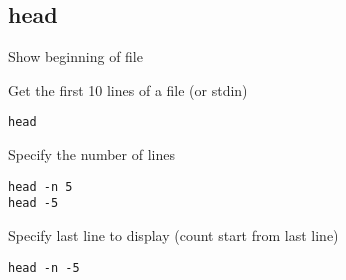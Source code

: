 \subsection{head}

\begin{frame}[fragile]{Show beginning of file}
  \begin{exampleblock}{Get the first 10 lines of a file (or stdin)}
    \begin{lstlisting}[showstringspaces=false,basicstyle=\tiny]
head
    \end{lstlisting}
  \end{exampleblock}
\pause

  \begin{exampleblock}{Specify the number of lines}
    \begin{lstlisting}[showstringspaces=false,basicstyle=\tiny]
head -n 5
head -5
    \end{lstlisting}
  \end{exampleblock}
\pause

  \begin{exampleblock}{Specify last line to display (count start from last line)}
    \begin{lstlisting}[showstringspaces=false,basicstyle=\tiny]
head -n -5
    \end{lstlisting}
  \end{exampleblock}
\end{frame}

